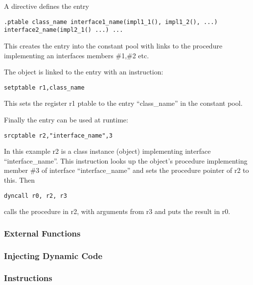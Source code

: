 A directive defines the entry

\begin{verbatim}
.ptable class_name interface1_name(impl1_1(), impl1_2(), ...) interface2_name(impl2_1() ...) ...
\end{verbatim}

This creates the entry into the constant pool with links to the
procedure implementing an interfaces members \#1,\#2 etc.

The object is linked to the entry with an instruction:

\begin{verbatim}
setptable r1,class_name
\end{verbatim}

This sets the register r1 ptable to the entry ``class\_name'' in the
constant pool.

Finally the entry can be used at runtime:

\begin{verbatim}
srcptable r2,"interface_name",3
\end{verbatim}

In this example r2 is a class instance (object) implementing interface
``interface\_name''. This instruction looks up the object's procedure
implementing member \#3 of interface ``interface\_name'' and sets the
procedure pointer of r2 to this. Then

\begin{verbatim}
dyncall r0, r2, r3
\end{verbatim}

calls the procedure in r2, with arguments from r3 and puts the result in
r0.

\hypertarget{external-functions}{%
\subsubsection{External Functions}\label{external-functions}}

\hypertarget{injecting-dynamic-code}{%
\subsubsection{Injecting Dynamic Code}\label{injecting-dynamic-code}}

\hypertarget{instructions-1}{%
\subsubsection{Instructions}\label{instructions-1}}


